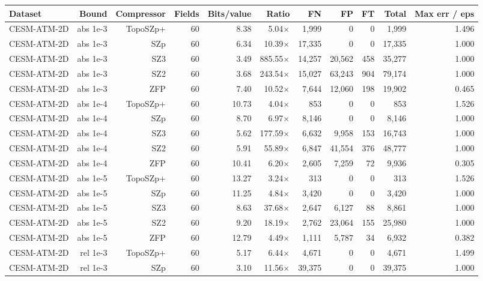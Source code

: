 \begin{tabular}{lrrrrrrrrrr}
\toprule
\textbf{Dataset} & \textbf{Bound} & \textbf{Compressor} & \textbf{Fields} & \textbf{Bits/value} & \textbf{Ratio} & \textbf{FN} & \textbf{FP} & \textbf{FT} & \textbf{Total} & \textbf{Max err / eps} \\
\midrule
CESM-ATM-2D & abs 1e-3 & TopoSZp+ & 60 & 8.38 & 5.04$\times$ & 1,999 & 0 & 0 & 1,999 & 1.496 \\
CESM-ATM-2D & abs 1e-3 & SZp & 60 & 6.34 & 10.39$\times$ & 17,335 & 0 & 0 & 17,335 & 1.000 \\
CESM-ATM-2D & abs 1e-3 & SZ3 & 60 & 3.49 & 885.55$\times$ & 14,257 & 20,562 & 458 & 35,277 & 1.000 \\
CESM-ATM-2D & abs 1e-3 & SZ2 & 60 & 3.68 & 243.54$\times$ & 15,027 & 63,243 & 904 & 79,174 & 1.000 \\
CESM-ATM-2D & abs 1e-3 & ZFP & 60 & 7.40 & 10.52$\times$ & 7,644 & 12,060 & 198 & 19,902 & 0.465 \\
CESM-ATM-2D & abs 1e-4 & TopoSZp+ & 60 & 10.73 & 4.04$\times$ & 853 & 0 & 0 & 853 & 1.526 \\
CESM-ATM-2D & abs 1e-4 & SZp & 60 & 8.70 & 6.97$\times$ & 8,146 & 0 & 0 & 8,146 & 1.000 \\
CESM-ATM-2D & abs 1e-4 & SZ3 & 60 & 5.62 & 177.59$\times$ & 6,632 & 9,958 & 153 & 16,743 & 1.000 \\
CESM-ATM-2D & abs 1e-4 & SZ2 & 60 & 5.91 & 55.89$\times$ & 6,847 & 41,554 & 376 & 48,777 & 1.000 \\
CESM-ATM-2D & abs 1e-4 & ZFP & 60 & 10.41 & 6.20$\times$ & 2,605 & 7,259 & 72 & 9,936 & 0.305 \\
CESM-ATM-2D & abs 1e-5 & TopoSZp+ & 60 & 13.27 & 3.24$\times$ & 313 & 0 & 0 & 313 & 1.526 \\
CESM-ATM-2D & abs 1e-5 & SZp & 60 & 11.25 & 4.84$\times$ & 3,420 & 0 & 0 & 3,420 & 1.000 \\
CESM-ATM-2D & abs 1e-5 & SZ3 & 60 & 8.63 & 37.68$\times$ & 2,647 & 6,127 & 88 & 8,861 & 1.000 \\
CESM-ATM-2D & abs 1e-5 & SZ2 & 60 & 9.20 & 18.19$\times$ & 2,762 & 23,064 & 155 & 25,980 & 1.000 \\
CESM-ATM-2D & abs 1e-5 & ZFP & 60 & 12.79 & 4.49$\times$ & 1,111 & 5,787 & 34 & 6,932 & 0.382 \\
CESM-ATM-2D & rel 1e-3 & TopoSZp+ & 60 & 5.17 & 6.44$\times$ & 4,671 & 0 & 0 & 4,671 & 1.499 \\
CESM-ATM-2D & rel 1e-3 & SZp & 60 & 3.10 & 11.56$\times$ & 39,375 & 0 & 0 & 39,375 & 1.000 \\

\end{tabular}
